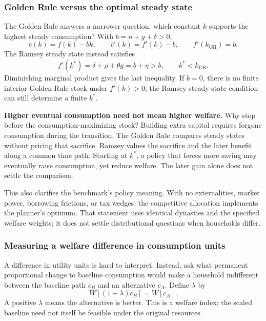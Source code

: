 \subsubsection{Golden Rule versus the optimal steady state}

The Golden Rule answers a narrower question: which constant $k$ supports the
highest steady consumption? With $b=n+g+\delta>0$,
\begin{equation}
\bar c(k)=f(k)-bk,\qquad
\bar c'(k)=f'(k)-b,\qquad f'(k_{\mathrm{GR}})=b.
\end{equation}
The Ramsey steady state instead satisfies
\begin{equation}
f'(k^*)=\delta+\rho+\theta g=b+\eta>b,
\qquad k^*<k_{\mathrm{GR}}.
\end{equation}
Diminishing marginal product gives the last inequality. If $b=0$, there is no
finite interior Golden Rule stock under $f'(k)>0$; the Ramsey steady-state
condition can still determine a finite $k^*$.

\begin{greenblock}
\textbf{Higher eventual consumption need not mean higher welfare.}
Why stop before the consumption-maximizing stock? Building extra capital
requires forgone consumption during the transition. The Golden Rule compares
steady states without pricing that sacrifice. Ramsey values the sacrifice
and the later benefit along a common time path. Starting at $k^*$, a policy
that forces more saving may eventually raise consumption, yet reduce welfare.
The later gain alone does not settle the comparison.
\end{greenblock}

This also clarifies the benchmark's policy meaning. With no externalities,
market power, borrowing frictions, or tax wedges, the competitive allocation
implements the planner's optimum. That statement uses identical dynasties and
the specified welfare weights; it does not settle distributional questions
when households differ.

\subsubsection{Measuring a welfare difference in consumption units}

A difference in utility units is hard to interpret. Instead, ask what permanent
proportional change to baseline consumption would make a household indifferent
between the baseline path $c_B$ and an alternative $c_A$. Define $\lambda$ by
\begin{equation}
W[(1+\lambda)c_B]=W[c_A].
\end{equation}
A positive $\lambda$ means the alternative is better. This is a welfare index;
the scaled baseline need not itself be feasible under the original resources.

